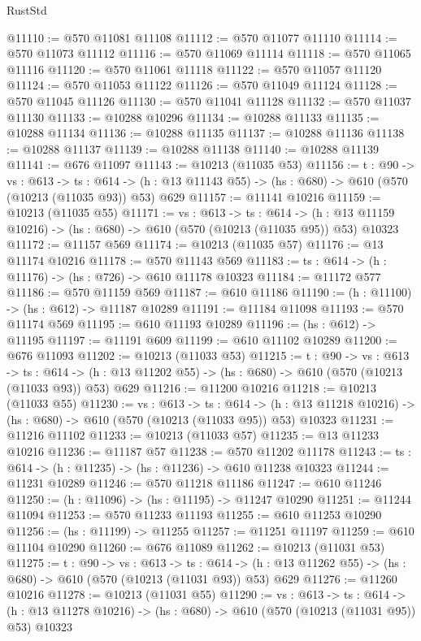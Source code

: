 \begin{lexlean}{RustStd}
\begin{coremodule}
@11110 := @570 @11081 @11108
@11112 := @570 @11077 @11110
@11114 := @570 @11073 @11112
@11116 := @570 @11069 @11114
@11118 := @570 @11065 @11116
@11120 := @570 @11061 @11118
@11122 := @570 @11057 @11120
@11124 := @570 @11053 @11122
@11126 := @570 @11049 @11124
@11128 := @570 @11045 @11126
@11130 := @570 @11041 @11128
@11132 := @570 @11037 @11130
@11133 := @10288 @10296
@11134 := @10288 @11133
@11135 := @10288 @11134
@11136 := @10288 @11135
@11137 := @10288 @11136
@11138 := @10288 @11137
@11139 := @10288 @11138
@11140 := @10288 @11139
@11141 := @676 @11097
@11143 := @10213 (@11035 @53)
@11156 := {t : @90} ->
  {vs : @613} ->
  {ts : @614} -> (h : @13 @11143 @55) -> (hs : @680) -> @610 (@570 (@10213 (@11035 @93)) @53) @629
@11157 := @11141 @10216
@11159 := @10213 (@11035 @55)
@11171 := {vs : @613} ->
  {ts : @614} ->
  (h : @13 @11159 @10216) -> (hs : @680) -> @610 (@570 (@10213 (@11035 @95)) @53) @10323
@11172 := @11157 @569
@11174 := @10213 (@11035 @57)
@11176 := @13 @11174 @10216
@11178 := @570 @11143 @569
@11183 := {ts : @614} -> (h : @11176) -> (hs : @726) -> @610 @11178 @10323
@11184 := @11172 @577
@11186 := @570 @11159 @569
@11187 := @610 @11186
@11190 := (h : @11100) -> (hs : @612) -> @11187 @10289
@11191 := @11184 @11098
@11193 := @570 @11174 @569
@11195 := @610 @11193 @10289
@11196 := (hs : @612) -> @11195
@11197 := @11191 @609
@11199 := @610 @11102 @10289
@11200 := @676 @11093
@11202 := @10213 (@11033 @53)
@11215 := {t : @90} ->
  {vs : @613} ->
  {ts : @614} -> (h : @13 @11202 @55) -> (hs : @680) -> @610 (@570 (@10213 (@11033 @93)) @53) @629
@11216 := @11200 @10216
@11218 := @10213 (@11033 @55)
@11230 := {vs : @613} ->
  {ts : @614} ->
  (h : @13 @11218 @10216) -> (hs : @680) -> @610 (@570 (@10213 (@11033 @95)) @53) @10323
@11231 := @11216 @11102
@11233 := @10213 (@11033 @57)
@11235 := @13 @11233 @10216
@11236 := @11187 @57
@11238 := @570 @11202 @11178
@11243 := {ts : @614} -> (h : @11235) -> (hs : @11236) -> @610 @11238 @10323
@11244 := @11231 @10289
@11246 := @570 @11218 @11186
@11247 := @610 @11246
@11250 := (h : @11096) -> (hs : @11195) -> @11247 @10290
@11251 := @11244 @11094
@11253 := @570 @11233 @11193
@11255 := @610 @11253 @10290
@11256 := (hs : @11199) -> @11255
@11257 := @11251 @11197
@11259 := @610 @11104 @10290
@11260 := @676 @11089
@11262 := @10213 (@11031 @53)
@11275 := {t : @90} ->
  {vs : @613} ->
  {ts : @614} -> (h : @13 @11262 @55) -> (hs : @680) -> @610 (@570 (@10213 (@11031 @93)) @53) @629
@11276 := @11260 @10216
@11278 := @10213 (@11031 @55)
@11290 := {vs : @613} ->
  {ts : @614} ->
  (h : @13 @11278 @10216) -> (hs : @680) -> @610 (@570 (@10213 (@11031 @95)) @53) @10323

\end{coremodule}
\end{lexlean}
